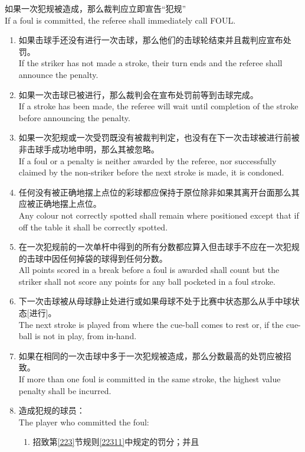 \noindent 如果一次犯规被造成，那么裁判应立即宣告``犯规''\\
If a foul is committed, the referee shall immediately call FOUL.
\begin{enumerate}[label=(\alph*)]
    \item 如果击球手还没有进行一次击球，那么他们的击球轮结束并且裁判应宣布处罚。\\
    If the striker has not made a stroke, their turn ends and the referee shall announce the penalty.
    \item 如果一次击球已被进行，那么裁判会在宣布处罚前等到击球完成。\\
    If a stroke has been made, the referee will wait until completion of the stroke before announcing the penalty.
    \item 如果一次犯规或一次受罚既没有被裁判判定，也没有在下一次击球被进行前被非击球手成功地申明，那么其被忽略。\\
    If a foul or a penalty is neither awarded by the referee, nor successfully claimed by the non-striker before the next stroke is made, it is condoned.
    \item 任何没有被正确地摆上点位的彩球都应保持于原位除非如果其离开台面那么其应被正确地摆上点位。\\
    Any colour not correctly spotted shall remain where positioned except that if off the table it shall be correctly spotted.
    \item 在一次犯规前的一次单杆中得到的所有分数都应算入但击球手不应在一次犯规的击球中因任何掉袋的球得到任何分数。\\
    All points scored in a break before a foul is awarded shall count but the striker shall not score any points for any ball pocketed in a foul stroke.
    \item 下一次击球被从母球静止处进行或如果母球不处于比赛中状态那么从手中球状态[进行]。\\
    The next stroke is played from where the cue-ball comes to rest or, if the cue-ball is not in play, from in-hand.
    \item 如果在相同的一次击球中多于一次犯规被造成，那么分数最高的处罚应被招致。\\
    If more than one foul is committed in the same stroke, the highest value penalty shall be incurred.
    \item 造成犯规的球员：\\
    The player who committed the foul:
    \begin{enumerate}[label=(\roman*)]
        \item 招致第\ref{223}节规则\ref{22311}中规定的罚分；并且\\

\end{enumerate}
\end{enumerate}
